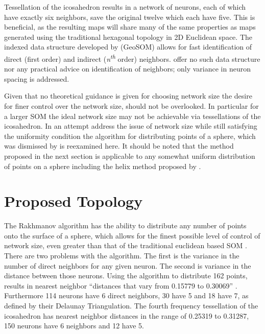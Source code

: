 \documentclass[12pt]{article}
\begin{document}
Tessellation of the icosahedron results in a network of neurons, each of which
have exactly six neighbors, save the original twelve which each have five.
This is beneficial, as the resulting maps will share many of the same
properties as maps generated using the traditional hexagonal topology in 2D
Euclidean space. The indexed data structure developed by
\citeauthor{Wu:2006lr} (GeoSOM) allows for fast identification of direct
(first order) and indirect (\textit{n\textsuperscript{th}} order) neighbors.
\cite{Nishio:2006fk} offer no such data structure nor any practical advice on
identification of neighbors; only variance in neuron spacing is addressed.

Given that no theoretical guidance is given for choosing network size the
desire for finer control over the network size, should not be overlooked. In
particular for a larger SOM the ideal network size may not be achievable via
tessellations of the icosahedron.  In an attempt address the issue of network
size while still satisfying the uniformity condition the \cite{Rakhmanov94}
algorithm for distributing points of a sphere, which was dismissed by
\cite{wu2005} is reexamined here.  It should be noted that the method proposed
in the next section is applicable to any somewhat uniform distribution of
points on a sphere including the helix method proposed by
\cite{Nishio:2006fk}.

\section{Proposed Topology}

The Rakhmanov algorithm has the ability to distribute any number of points
onto the surface of a sphere, which allows for the finest possible level of
control of network size, even greater than that of the traditional euclidean
based SOM \citep{Rakhmanov94}.  There are two problems with the \citeauthor{Rakhmanov94}
algorithm. The first is the variance in the number of direct neighbors for any
given neuron.  The second is variance in the distance between those neurons.
Using the algorithm to distribute 162 points, results in nearest neighbor
``distances that vary from 0.15779 to 0.30069'' \cite[pg 3]{wu2005}.
Furthermore 114 neurons have 6 direct neighbors, 30 have 5 and 18 have 7, as
defined by their Delaunay Triangulation.  The fourth frequency tessellation of
the icosahedron has nearest neighbor distances in the range of 0.25319 to
0.31287, 150 neurons have 6 neighbors and 12 have 5.
\end{document}
